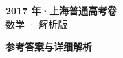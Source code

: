 \documentclass[zihao=-4, a4paper]{ctexart}
\begin{document}
\begin{center}
  {\Large\bfseries 2017 年·上海普通高考卷}\\[4pt]
  {\large 数学 · 解析版}
\end{center}
\medskip
{}

\clearpage
{}
\begin{center}{\Large\bfseries 参考答案与详细解析}\end{center}
\medskip

\end{document}
